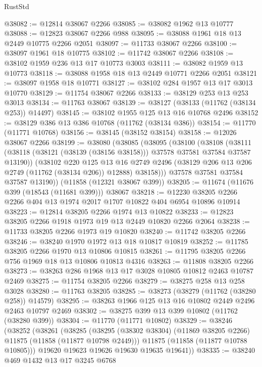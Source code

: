 \begin{lexlean}{RustStd}
\begin{coremodule}
@38082 := @12814 @38067 @2266
@38085 := @38082 @1962 @13 @10777
@38088 := @12823 @38067 @2266 @988
@38095 := @38088 @1961 @18 @13 @2449 @10775 @2266 @2051
@38097 := @11733 @38067 @2266
@38100 := @38097 @1961 @18 @10775
@38102 := @11742 @38067 @2266
@38108 := @38102 @1959 @236 @13 @17 @10773 @3003
@38111 := @38082 @1959 @13 @10773
@38118 := @38088 @1958 @18 @13 @2449 @10771 @2266 @2051
@38121 := @38097 @1958 @18 @10771
@38127 := @38102 @284 @1957 @13 @17 @3013 @10770
@38129 := @11754 @38067 @2266
@38133 := @38129 @253 @13 @253 @3013
@38134 := @11763 @38067
@38139 := @38127 (@38133 (@11762 (@38134 @253)) @14497)
@38145 := @38102 @1955 @125 @13 @16 @10768 @2496
@38152 := @38129 @386 @13 @386 @10768 (@11762 (@38134 @386))
@38154 := @11770 (@11771 @10768)
@38156 := @38145 (@38152 @38154)
@38158 := @12026 @38067 @2266
@38199 := @38080
    (@38085
      (@38095
        (@38100
          (@38108
            (@38111 (@38118 (@38121 (@38139 (@38156 @38158))) @37578 @37581 @37584 @37587 @13190))
            (@38102
              @220
              @125
              @13
              @16
              @2749
              @2496
              (@38129 @206 @13 @206 @2749 (@11762 (@38134 @206)) @12888)
              @38158)))
        @37578
        @37581
        @37584
        @37587
        @13190))
    (@11858 (@12321 @38067 @399))
@38205 := @11674 (@11676 @399 (@18543 (@11681 @399))) @38067
@38218 := @12230 @38205 @2266 @2266 @404 @13 @1974 @2017 @1707 @10822 @404 @6954 @10896 @10914
@38223 := @12814 @38205 @2266 @1974 @13 @10822
@38233 := @12823 @38205 @2266 @1918 @1973 @19 @13 @2449 @10820 @2266 @2064
@38238 := @11733 @38205 @2266 @1973 @19 @10820
@38240 := @11742 @38205 @2266
@38246 := @38240 @1970 @1972 @13 @18 @10817 @10819
@38252 := @11785 @38205 @2266 @1970 @13 @10806 @10815
@38261 := @11795 @38205 @2266 @756 @1969 @18 @13 @10806 @10813 @4316
@38263 := @11808 @38205 @2266
@38273 := @38263 @286 @1968 @13 @17 @3028 @10805 @10812 @2463 @10787 @2469
@38275 := @11754 @38205 @2266
@38279 := @38275 @258 @13 @258 @3028
@38280 := @11763 @38205
@38285 := @38273 (@38279 (@11762 (@38280 @258)) @14579)
@38295 := @38263 @1966 @125 @13 @16 @10802 @2449 @2496 @2463 @10797 @2469
@38302 := @38275 @399 @13 @399 @10802 (@11762 (@38280 @399))
@38304 := @11770 (@11771 @10802)
@38329 := @38246
    (@38252
      (@38261
        (@38285
          (@38295 (@38302 @38304) (@11869 @38205 @2266) @11875 (@11858 (@11877 @10798 @2449)))
          @11875
          (@11858 (@11877 @10788 @10805)))
        @19620
        @19623
        @19626
        @19630
        @19635
        @19641))
@38335 := @38240 @469 @1432 @13 @17 @3245 @6768

\end{coremodule}
\end{lexlean}
